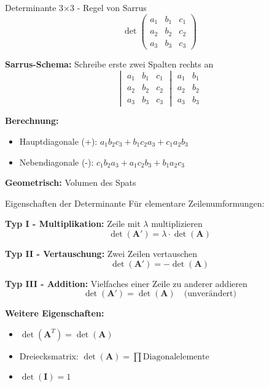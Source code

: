 \documentclass[a4paper, fontsize=7pt]{scrartcl}
\begin{document}
\begin{mainbox}{Determinante 3×3 - Regel von Sarrus}
$$\det\begin{pmatrix} a_1 & b_1 & c_1 \\ a_2 & b_2 & c_2 \\ a_3 & b_3 & c_3 \end{pmatrix}$$

\textbf{Sarrus-Schema:} Schreibe erste zwei Spalten rechts an
$$\begin{vmatrix} a_1 & b_1 & c_1 \\ a_2 & b_2 & c_2 \\ a_3 & b_3 & c_3 \end{vmatrix} \begin{matrix} a_1 & b_1 \\ a_2 & b_2 \\ a_3 & b_3 \end{matrix}$$

\textbf{Berechnung:}
\begin{itemize}
    \item Hauptdiagonale (+): $a_1b_2c_3 + b_1c_2a_3 + c_1a_2b_3$
    \item Nebendiagonale (-): $c_1b_2a_3 + a_1c_2b_3 + b_1a_2c_3$
\end{itemize}

\textbf{Geometrisch:} Volumen des Spats
\end{mainbox}

\begin{mainbox}{Eigenschaften der Determinante}
Für elementare Zeilenumformungen:

\textbf{Typ I - Multiplikation:} Zeile mit $\lambda$ multiplizieren
$$\det(\mathbf{A}') = \lambda \cdot \det(\mathbf{A})$$

\textbf{Typ II - Vertauschung:} Zwei Zeilen vertauschen
$$\det(\mathbf{A}') = -\det(\mathbf{A})$$

\textbf{Typ III - Addition:} Vielfaches einer Zeile zu anderer addieren
$$\det(\mathbf{A}') = \det(\mathbf{A}) \quad \text{(unverändert)}$$

\textbf{Weitere Eigenschaften:}
\begin{itemize}
    \item $\det(\mathbf{A}^T) = \det(\mathbf{A})$
    \item Dreiecksmatrix: $\det(\mathbf{A}) = \prod \text{Diagonalelemente}$
    \item $\det(\mathbf{I}) = 1$
\end{itemize}
\end{mainbox}
\end{document}

